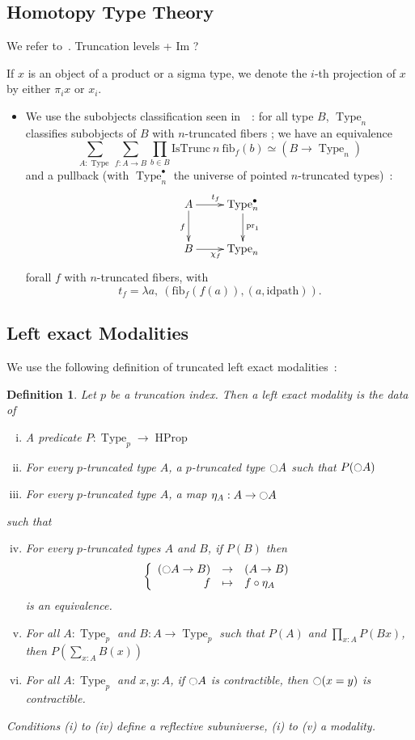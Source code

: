 \documentclass[conference]{IEEEtran}
\newtheorem{defi}[thm]{Definition}
\DeclareMathOperator{\Type}{Type}
\DeclareMathOperator{\HProp}{HProp}
\newcommand{\modal}{\ensuremath{\ocircle}}
\begin{document}
\subsection{Homotopy Type Theory}
\label{ssec:hott}

We refer to~\cite{hottbook}.
Truncation levels + Im ?

If $x$ is an object of a product or a sigma type, we denote the $i$-th
projection of $x$ by either $\pi_i x$ or $x_i$.

\begin{itemize}
\item 

We use the subobjects classification seen in~\cite{sets_in_hott}~: for
all type $B$, $\Type_n$ classifies subobjects of $B$ with $n$-truncated
fibers ; we have an equivalence
$$\sum_{A:\Type} \sum_{f:A \to B} \prod_{b\in B}
\mathrm{IsTrunc}~n~\mathrm{fib}_f(b) \simeq (B \to \Type_n)$$
and a pullback (with $\Type_n^\bullet$ the universe of pointed
$n$-truncated types)~:
$$
\xymatrix{
  A \ar[r]^{t_f} \ar[d]_f & \Type_n^\bullet \ar[d]^{\mathrm{pr}_1}\\
  B \ar[r]_{\chi_f} & \Type_n
}
$$
forall $f$ with $n$-truncated fibers, with 
$$t_f = \lambda a,~(\mathrm{fib}_f(f(a)),(a,\mathrm{idpath})).$$
\end{itemize}

\subsection{Left exact Modalities}
\label{sec:lexmod}

We use the following definition of truncated left exact modalities~:
\begin{defi}
  Let $p$ be a truncation index. Then a left exact modality is the
  data of
  \begin{enumerate}[(i)]
  \item A predicate $P:\Type_p \to \HProp$
  \item For every $p$-truncated type $A$, a $p$-truncated type
    $\modal A$ such that $P(\modal A)$
  \item For every $p$-truncated type $A$, a map $\eta_A:A \to
    \modal A$
  \end{enumerate}
  such that
  \begin{enumerate}[(i)]
    \setcounter{enumi}{3}
  \item For every $p$-truncated types $A$ and $B$, if $P(B)$ then
    $$\left\{
      \begin{array}{rcl}
        (\modal A \to B) & \to & (A \to B) \\
        f & \mapsto & f \circ \eta_A
      \end{array} \right.$$
    is an equivalence.
  \item For all $A:\Type_p$ and $B:A \to \Type_p$ such that $P(A)$
    and $\prod_{x:A} P(B x)$, then $P\left( \sum_{x:A} B(x)\right)$
  \item For all $A:\Type_p$ and $x,y:A$, if $\modal A$ is
    contractible, then $\modal (x=y)$ is contractible.
  \end{enumerate}
  Conditions (i) to (iv) define a {\em reflective subuniverse}, (i) to
  (v) a {\em modality}.
\end{defi}
\end{document}
